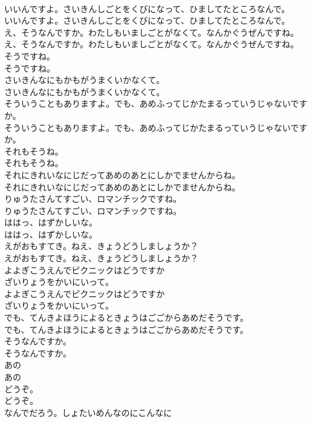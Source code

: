 \documentclass[8pt]{extreport}
\begin{document}
\begin{CJK}{UTF8}{min}
\\	いいんですよ。さいきんしごとをくびになって、ひましてたところなんで。
\\	いいんですよ。さいきんしごとをくびになって、ひましてたところなんで。
\\	え、そうなんですか。わたしもいましごとがなくて。なんかぐうぜんですね。
\\	え、そうなんですか。わたしもいましごとがなくて。なんかぐうぜんですね。
\\	そうですね。
\\	そうですね。
\\	さいきんなにもかもがうまくいかなくて。
\\	さいきんなにもかもがうまくいかなくて。
\\	そういうこともありますよ。でも、あめふってじかたまるっていうじゃないですか。
\\	そういうこともありますよ。でも、あめふってじかたまるっていうじゃないですか。
\\	それもそうね。
\\	それもそうね。
\\	それにきれいなにじだってあめのあとにしかでませんからね。
\\	それにきれいなにじだってあめのあとにしかでませんからね。
\\	りゅうたさんてすごい、ロマンチックですね。
\\	りゅうたさんてすごい、ロマンチックですね。
\\	ははっ、はずかしいな。
\\	ははっ、はずかしいな。
\\	えがおもすてき。ねえ、きょうどうしましょうか？
\\	えがおもすてき。ねえ、きょうどうしましょうか？
\\	よよぎこうえんでピクニックはどうですか
\\	ざいりょうをかいにいって。
\\	よよぎこうえんでピクニックはどうですか
\\	ざいりょうをかいにいって。
\\	でも、てんきよほうによるときょうはごごからあめだそうです。
\\	でも、てんきよほうによるときょうはごごからあめだそうです。
\\	そうなんですか。
\\	そうなんですか。
\\	あの
\\	あの
\\	どうぞ。
\\	どうぞ。
\\	なんでだろう。しょたいめんなのにこんなに

\end{CJK}
\end{document}
